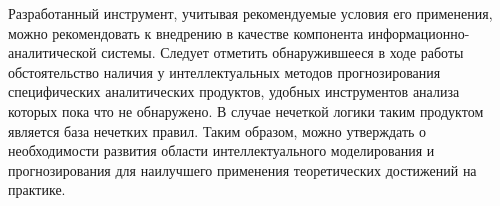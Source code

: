 Разработанный инструмент, учитывая рекомендуемые условия его применения,  можно
рекомендовать к внедрению в качестве компонента информационно-аналитической
системы. Следует отметить обнаружившееся в ходе работы обстоятельство наличия у
интеллектуальных методов прогнозирования специфических аналитических продуктов,
удобных инструментов анализа которых пока что не обнаружено. В случае нечеткой
логики таким продуктом является база нечетких правил. Таким образом, можно
утверждать о необходимости развития области интеллектуального моделирования и
прогнозирования для наилучшего применения теоретических достижений на практике.
